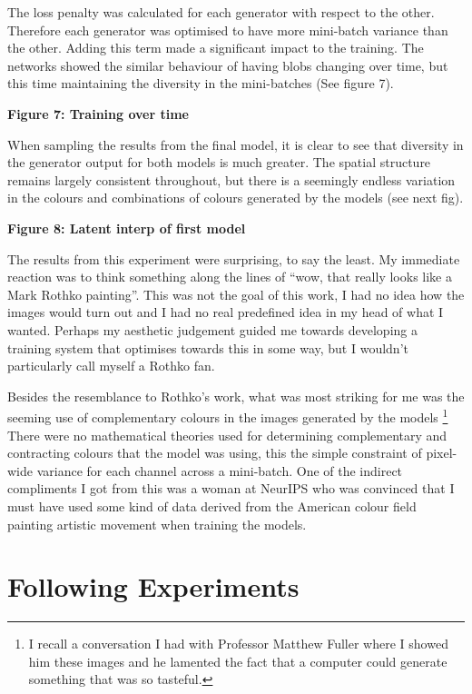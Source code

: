 The loss penalty was calculated for each generator with respect to the other. 
Therefore each generator was optimised to have more mini-batch variance than the other. 
Adding this term made a significant impact to the training. 
The networks showed the similar behaviour of having blobs changing over time, but this time maintaining the diversity in the mini-batches (See figure 7). 

\textbf{Figure 7: Training over time}

When sampling the results from the final model, it is clear to see that diversity in the generator output for both models is much greater. 
The spatial structure remains largely consistent throughout, but there is a seemingly endless variation in the colours and combinations of colours generated by the models (see next fig).

\textbf{Figure 8: Latent interp of first model}

The results from this experiment were surprising, to say the least. 
My immediate reaction was to think something along the lines of “wow, that really looks like a Mark Rothko painting”. 
This was not the goal of this work, I had no idea how the images would turn out and I had no real predefined idea in my head of what I wanted. 
Perhaps my aesthetic judgement guided me towards developing a training system that optimises towards this in some way, but I wouldn't particularly call myself a Rothko fan. 

Besides the resemblance to Rothko’s work, what was most striking for me was the seeming use of complementary colours in the images generated by the models \footnote{I recall a conversation I had with Professor Matthew Fuller where I showed him these images and he lamented the fact that a computer could generate something that was so tasteful.} 
There were no mathematical theories used for determining complementary and contracting colours that the model was using, this the simple constraint of pixel-wide variance for each channel across a mini-batch. 
One of the indirect compliments I got from this was a woman at NeurIPS who was convinced that I must have used some kind of data derived from the American colour field painting artistic movement when training the models.

\section{Following Experiments}

